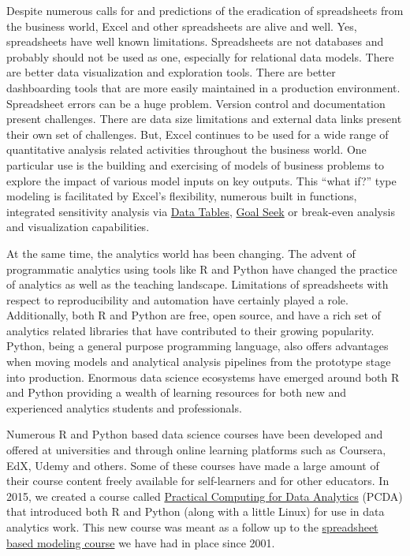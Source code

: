 \documentclass[ited,blindrev]{informs3}              %
\begin{document}
Despite numerous calls for and predictions of the eradication of spreadsheets from the business world, Excel and other spreadsheets are alive and well. Yes, spreadsheets have well known limitations. Spreadsheets are not databases and probably should not be used as one, especially for relational data models. There are better data visualization and exploration tools. There are better dashboarding tools that are more easily maintained in a production environment. Spreadsheet errors can be a huge problem. Version control and documentation present challenges. There are data size limitations and external data links present their own set of challenges. But, Excel continues to be used for a wide range of quantitative analysis related activities throughout the business world. One particular use is the building and exercising of models of business problems
to explore the impact of various model inputs on key outputs. This ``what if?'' type modeling is facilitated by Excel's flexibility, numerous built in functions, integrated sensitivity analysis via \href{https://support.microsoft.com/en-us/office/calculate-multiple-results-by-using-a-data-table-e95e2487-6ca6-4413-ad12-77542a5ea50b}{Data Tables},  \href{https://support.microsoft.com/en-us/office/use-goal-seek-to-find-the-result-you-want-by-adjusting-an-input-value-320cb99e-f4a4-417f-b1c3-4f369d6e66c7}{Goal
	Seek} or break-even analysis and visualization capabilities. 

At the same time, the analytics world has been changing. The advent of programmatic analytics using tools like R and Python have changed the practice of analytics as well as the teaching landscape. Limitations of spreadsheets with respect to reproducibility and automation have certainly played a role.  Additionally, both R and Python are free, open source, and have a rich set of analytics related libraries that have contributed to their growing popularity. Python, being a general purpose programming language, also offers advantages when moving models and analytical analysis pipelines from the prototype stage into production. Enormous data science ecosystems have emerged around both R and Python providing a wealth of learning resources for both new and experienced analytics students and professionals.

Numerous R and Python based data science courses have been developed and offered at universities and through online learning platforms such as Coursera, EdX, Udemy and others. Some of these courses have made a large amount of their course content freely available for self-learners and for other educators.  In 2015, we created a course called \href{http://www.sba.oakland.edu/faculty/isken/courses/mis5470/}{Practical Computing for Data Analytics} (PCDA) that introduced both R and Python (along with a little Linux) for use in data analytics work. This new course was meant as a follow up to the \href{http://www.sba.oakland.edu/faculty/isken/courses/mis5460/}{spreadsheet based modeling course} we have had in place since 2001.
\end{document}
